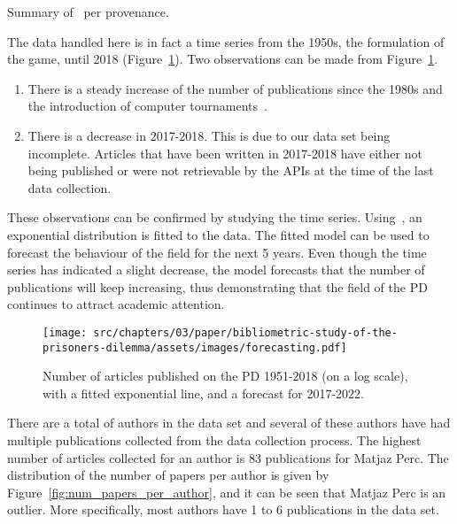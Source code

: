 \begin{table}[!hbtp]
    \begin{center}
    \resizebox{.9\textwidth}{!}{
    }
    \end{center}
    \caption{Summary of~\cite{pd_data_2018} per provenance.}
    \label{table:preliminary_table}
\end{table}

The data handled  here is in fact a time series from the 1950s, the formulation
of the game, until 2018 (Figure~\ref{fig:timeseries}). Two observations can be
made from Figure~\ref{fig:timeseries}.

\begin{enumerate}
    \item There is a steady increase of the number of publications since the
    1980s and the introduction of computer tournaments~\cite{Axelrod1981}.
    \item There is a decrease in 2017-2018. This is due to our data set being
    incomplete. Articles that have been written in 2017-2018 have either not
    being published or were not retrievable by the APIs at the time of the last
    data collection.
\end{enumerate}

These observations can be confirmed by studying the time series.
Using~\cite{scipy}, an exponential distribution is fitted to the data.
The fitted model can be used to forecast the
behaviour of the field for the next 5 years. Even
though the time series has indicated a slight decrease, the model forecasts that
the number of publications will keep increasing, thus demonstrating that the
field of the PD continues to attract academic attention.

\begin{figure}[!hbtp]
    \centering
    \texttt{[image: src/chapters/03/paper/bibliometric-study-of-the-prisoners-dilemma/assets/images/forecasting.pdf]}
    \caption{Number of articles published on the PD 1951-2018 (on a log scale),
    with a fitted exponential line, and a forecast for 2017-2022.}\label{fig:timeseries}
\end{figure}

There are a total of \authors authors in the data set and several of these
authors have had multiple publications collected from the data collection process.
The highest number of articles collected for an
author is 83 publications for Matjaz Perc. The distribution of the number of
papers per author is given by Figure~\ref{fig:num_papers_per_author}, and it can
be seen that Matjaz Perc is an outlier. More specifically, most authors have
1 to 6 publications in the data set.

